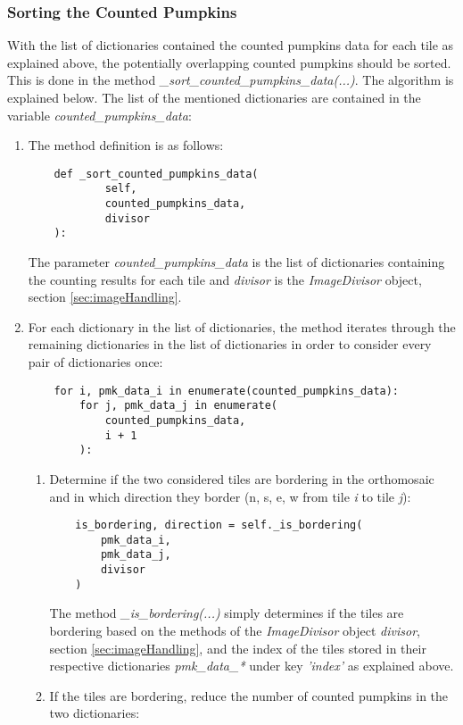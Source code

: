 \documentclass[../Head/Main.tex]{subfiles}
\begin{document}
\subsubsection{Sorting the Counted Pumpkins}
With the list of dictionaries contained the counted pumpkins data for each tile as explained above, the potentially overlapping counted pumpkins should be sorted. This is done in the method \textit{\_sort\_counted\_pumpkins\_data(...)}. The algorithm is explained below. The list of the mentioned dictionaries are contained in the variable \linebreak \textit{counted\_pumpkins\_data}:
\begin{enumerate}
\item The method definition is as follows:
\begin{verbatim}
    def _sort_counted_pumpkins_data(
            self,
            counted_pumpkins_data,
            divisor
    ):
\end{verbatim}
The parameter \textit{counted\_pumpkins\_data} is the list of dictionaries containing the counting results for each tile and \textit{divisor} is the \textit{ImageDivisor} object, section \ref{sec:imageHandling}.
\item For each dictionary in the list of dictionaries, the method iterates through the remaining dictionaries in the list of dictionaries in order to consider every pair of dictionaries once:
\begin{verbatim}
    for i, pmk_data_i in enumerate(counted_pumpkins_data):
        for j, pmk_data_j in enumerate(
            counted_pumpkins_data,
            i + 1
        ):
\end{verbatim}
\begin{enumerate}
\item Determine if the two considered tiles are bordering in the orthomosaic and in which direction they border (n, s, e, w from tile \textit{i} to tile \textit{j}):
\begin{verbatim}
    is_bordering, direction = self._is_bordering(
        pmk_data_i,
        pmk_data_j,
        divisor
    )
\end{verbatim}
The method \textit{\_is\_bordering(...)} simply determines if the tiles are bordering based on the methods of the \textit{ImageDivisor} object \textit{divisor}, section \ref{sec:imageHandling}, and the index of the tiles stored in their respective dictionaries \textit{pmk\_data\_*} under key \textit{'index'} as explained above.
\item If the tiles are bordering, reduce the number of counted pumpkins in the two dictionaries:

\end{enumerate}
\end{enumerate}
\end{document}
